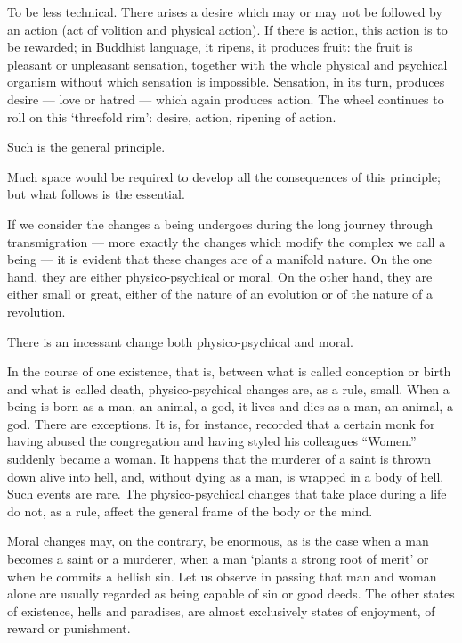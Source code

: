 \documentclass[a4paper, 11pt, oneside, english]{article}
\begin{document}
To be less technical. There arises a desire which may or may not be followed by an action (act of volition and physical action). If there is action, this action is to be rewarded; in Buddhist language, it ripens, it produces fruit: the fruit is pleasant or unpleasant sensation, together with the whole physical and psychical organism without which sensation is impossible. Sensation, in its turn, produces desire --- love or hatred --- which again produces action. The wheel continues to roll on this `threefold rim': desire, action, ripening of action.

Such is the general principle.

Much space would be required to develop all the consequences of this principle; but what follows is the essential.

If we consider the changes a being undergoes during the long journey through transmigration --- more exactly the changes which modify the complex we call a being --- it is evident that these changes are of a manifold nature. On the one hand, they are either physico-psychical or moral. On the other hand, they are either small or great, either of the nature of an evolution or of the nature of a revolution.

There is an incessant change both physico-psychical and moral.

In the course of one existence, that is, between what is called conception or birth and what is called death, physico-psychical changes are, as a rule, small. When a being is born as a man, an animal, a god, it lives and dies as a man, an animal, a god. There are exceptions. It is, for instance, recorded that a certain monk for having abused the congregation and having styled his colleagues ``Women.'' suddenly became a woman. It happens that the murderer of a saint is thrown down alive into hell, and, without dying as a man, is wrapped in a body of hell. Such events are rare. The physico-psychical changes that take place during a life do not, as a rule, affect the general frame of the body or the mind.

Moral changes may, on the contrary, be enormous, as is the case when a man becomes a saint or a murderer, when a man `plants a strong root of merit' or when he commits a hellish sin. Let us observe in passing that man and woman alone are usually regarded as being capable of sin or good deeds. The other states of existence, hells and paradises, are almost exclusively states of enjoyment, of reward or punishment.
\end{document}
